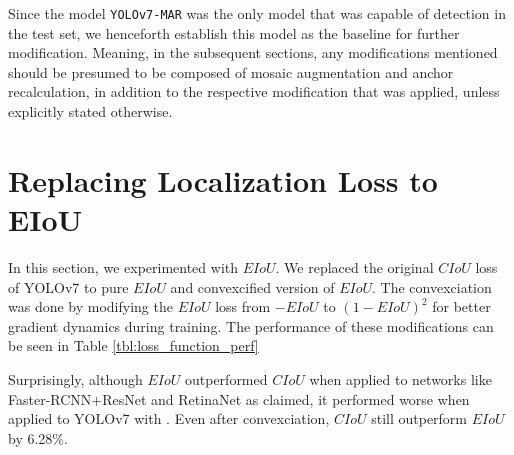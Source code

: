 Since the model \verb|YOLOv7-MAR| was the only model that was capable of detection in the test set,
we henceforth establish this model as the baseline for further modification. Meaning, in the subsequent
sections, any modifications mentioned should be presumed to be composed of mosaic augmentation and anchor recalculation,
in addition to the respective modification that was applied, unless explicitly stated otherwise.



\section{Replacing Localization Loss to EIoU}
In this section, we experimented with $EIoU$.
We replaced the original $CIoU$ loss of YOLOv7 to pure $EIoU$ and convexcified version of $EIoU$.
The convexciation was done by modifying the $EIoU$ loss from $-EIoU$ to $(1-EIoU)^2$ for better
gradient dynamics during training.
The performance of these modifications can be seen in Table \ref{tbl:loss_function_perf}

\begin{table}[b]
  \centering
  \label{tbl:loss_function_perf}
  \vspace{-1ex}
  
\end{table}

Surprisingly, although $EIoU$ outperformed $CIoU$ when applied to networks like Faster-RCNN+ResNet and RetinaNet
as \textcite{eiou} claimed, it performed worse when applied to YOLOv7 with \textcite{aot_dataset}.
Even after convexciation, $CIoU$ still outperform $EIoU$ by 6.28\%.

